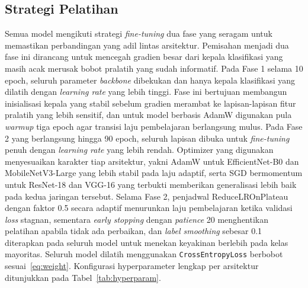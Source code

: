 \documentclass[conference]{IEEEtran}
\begin{document}
\subsection{Strategi Pelatihan}

Semua model mengikuti strategi \textit{fine-tuning} dua fase yang
seragam untuk memastikan perbandingan yang adil lintas arsitektur.
Pemisahan menjadi dua fase ini dirancang untuk mencegah gradien besar
dari kepala klasifikasi yang masih acak merusak bobot pralatih yang
sudah informatif.
Pada Fase 1 selama 10 epoch, seluruh parameter \textit{backbone}
dibekukan dan hanya kepala klasifikasi yang dilatih dengan
\textit{learning rate} yang lebih tinggi.
Fase ini bertujuan membangun inisialisasi kepala yang stabil sebelum
gradien merambat ke lapisan-lapisan fitur pralatih yang lebih sensitif,
dan untuk model berbasis AdamW digunakan pula \textit{warmup}
tiga epoch agar transisi laju pembelajaran berlangsung mulus.
Pada Fase 2 yang berlangsung hingga 90 epoch, seluruh lapisan
dibuka untuk \textit{fine-tuning} penuh dengan \textit{learning rate}
yang lebih rendah.
Optimizer yang digunakan menyesuaikan karakter tiap arsitektur,
yakni AdamW untuk EfficientNet-B0 dan MobileNetV3-Large yang lebih
stabil pada laju adaptif, serta SGD bermomentum untuk ResNet-18 dan
VGG-16 yang terbukti memberikan generalisasi lebih baik pada kedua
jaringan tersebut.
Selama Fase 2, penjadwal ReduceLROnPlateau dengan faktor 0.5
secara adaptif menurunkan laju pembelajaran ketika validasi
\textit{loss} stagnan, sementara \textit{early stopping} dengan
\textit{patience} 20 menghentikan pelatihan apabila tidak ada
perbaikan, dan \textit{label smoothing} sebesar 0.1 diterapkan pada
seluruh model untuk menekan keyakinan berlebih pada kelas mayoritas.
Seluruh model dilatih menggunakan \texttt{CrossEntropyLoss} berbobot
sesuai~\eqref{eq:weight}.
Konfigurasi hyperparameter lengkap per arsitektur ditunjukkan pada
Tabel~\ref{tab:hyperparam}.
\end{document}
